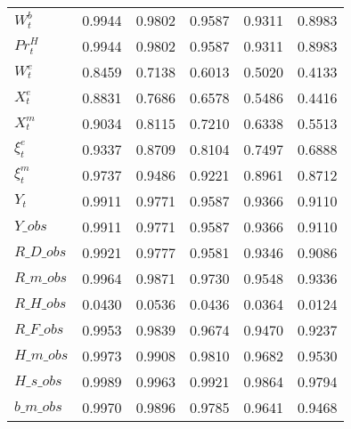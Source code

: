 \begin{center}
\begin{longtable}{lccccc}
$ W^b_t                     $	 & 	        0.9944	 & 	        0.9802	 & 	        0.9587	 & 	        0.9311	 & 	        0.8983 \\ 
$ Pr^H_t                    $	 & 	        0.9944	 & 	        0.9802	 & 	        0.9587	 & 	        0.9311	 & 	        0.8983 \\ 
$ W^e_t                     $	 & 	        0.8459	 & 	        0.7138	 & 	        0.6013	 & 	        0.5020	 & 	        0.4133 \\ 
$ X^e_t                     $	 & 	        0.8831	 & 	        0.7686	 & 	        0.6578	 & 	        0.5486	 & 	        0.4416 \\ 
$ X^m_t                     $	 & 	        0.9034	 & 	        0.8115	 & 	        0.7210	 & 	        0.6338	 & 	        0.5513 \\ 
$ \xi^e_t                   $	 & 	        0.9337	 & 	        0.8709	 & 	        0.8104	 & 	        0.7497	 & 	        0.6888 \\ 
$  \xi^m_t                  $	 & 	        0.9737	 & 	        0.9486	 & 	        0.9221	 & 	        0.8961	 & 	        0.8712 \\ 
$ Y_t                       $	 & 	        0.9911	 & 	        0.9771	 & 	        0.9587	 & 	        0.9366	 & 	        0.9110 \\ 
$Y\_obs                     $	 & 	        0.9911	 & 	        0.9771	 & 	        0.9587	 & 	        0.9366	 & 	        0.9110 \\ 
$R\_D\_obs                  $	 & 	        0.9921	 & 	        0.9777	 & 	        0.9581	 & 	        0.9346	 & 	        0.9086 \\ 
$R\_m\_obs                  $	 & 	        0.9964	 & 	        0.9871	 & 	        0.9730	 & 	        0.9548	 & 	        0.9336 \\ 
$R\_H\_obs                  $	 & 	        0.0430	 & 	        0.0536	 & 	        0.0436	 & 	        0.0364	 & 	        0.0124 \\ 
$R\_F\_obs                  $	 & 	        0.9953	 & 	        0.9839	 & 	        0.9674	 & 	        0.9470	 & 	        0.9237 \\ 
$H\_m\_obs                  $	 & 	        0.9973	 & 	        0.9908	 & 	        0.9810	 & 	        0.9682	 & 	        0.9530 \\ 
$H\_s\_obs                  $	 & 	        0.9989	 & 	        0.9963	 & 	        0.9921	 & 	        0.9864	 & 	        0.9794 \\ 
$b\_m\_obs                  $	 & 	        0.9970	 & 	        0.9896	 & 	        0.9785	 & 	        0.9641	 & 	        0.9468 \\ 

\end{longtable}
\end{center}
